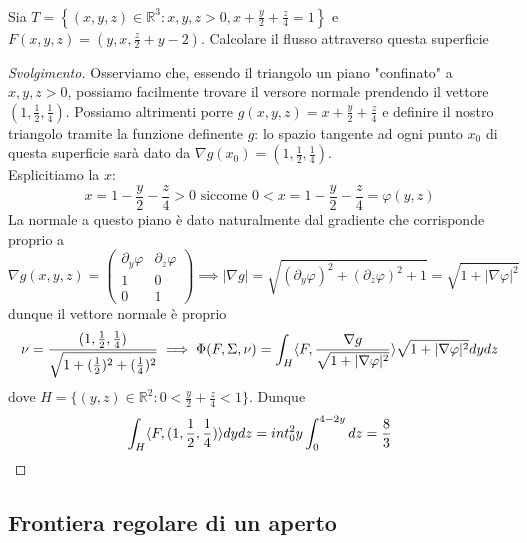\begin{example} \hspace{1cm} \\
	Sia $T=\left\{(x, y, z) \in \mathbb{R}^3: x, y, z > 0, x + \frac{y}{2}+\frac{z}{4}=1 \right\}$ e $F(x, y, z)=(y, x, \frac{z}{2}+ y - 2)$. Calcolare il flusso attraverso questa superficie
\end{example}
\begin{proof}[Svolgimento]
	Osserviamo che, essendo il triangolo un piano "confinato" a $x, y, z > 0$, possiamo facilmente trovare il versore normale prendendo il vettore $(1, \frac{1}{2}, \frac{1}{4})$. Possiamo altrimenti porre
	$g(x, y, z) = x + \frac{y}{2} + \frac{z}{4}$ e definire il nostro triangolo tramite la funzione definente $g$: lo spazio tangente ad ogni punto $x_0$ di questa superficie sarà dato da $\nabla g(x_0) = (1, \frac{1}{2},\frac{1}{4})$. \\
	Esplicitiamo la $x$:
	$$
	x = 1 - \frac{y}{2} - \frac{z}{4} > 0 \text{ siccome } 0 < x = 1 - \frac{y}{2} - \frac{z}{4} = \varphi(y, z)
	$$
	La normale a questo piano è dato naturalmente dal gradiente che corrisponde proprio a
	$$
	\nabla g(x, y, z) = \begin{pmatrix} 
		\partial_y \varphi & \partial_z \varphi \\
		1 & 0 \\
		0 & 1
	\end{pmatrix} \implies |\nabla g| = \sqrt{(\partial_y \varphi)^2 + (\partial_z \varphi)^2 + 1} = \sqrt{1 + |\nabla \varphi|^2} 
	$$
	dunque il vettore normale è proprio
	$$
	\nu = \frac{(1, \frac{1}{2}, \frac{1}{4})}{\sqrt{1 + (\frac{1}{2})^2 + (\frac{1}{4})^2}} \implies \Phi(F, \Sigma, \nu) = \int_H \langle F, \frac{\nabla g}{\sqrt{1 + |\nabla \varphi|^2}} \rangle \sqrt{1 + |\nabla \varphi|^2} dydz
	$$
	dove $H = \{(y, z) \in \mathbb{R}^2 : 0 < \frac{y}{2} + \frac{z}{4} < 1 \}$. Dunque
	$$
	\int_H \langle F, (1, \frac{1}{2}, \frac{1}{4}) \rangle dydz =	int_0^2 y \int_0^{4 - 2y} dz = \frac{8}{3}
	$$
\end{proof}

\subsection{Frontiera regolare di un aperto}

